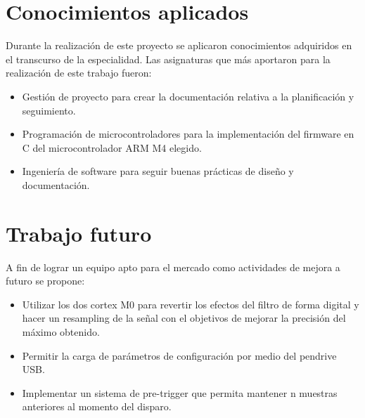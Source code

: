 \newpage
\section{Conocimientos aplicados}

Durante la realización de este proyecto se aplicaron conocimientos adquiridos en el transcurso de la especialidad. Las asignaturas que más aportaron para la realización de este trabajo fueron:
\begin{itemize}
\item Gestión de proyecto para crear la documentación relativa a la planificación y seguimiento.
\item Programación de microcontroladores para la implementación del firmware en C del microcontrolador ARM M4 elegido.
\item Ingeniería de software para seguir buenas prácticas de diseño y documentación.
\end{itemize}

\section{Trabajo futuro}
A fin de lograr un equipo apto para el mercado como actividades de mejora a futuro se propone:
\begin{itemize}
\item Utilizar los dos cortex M0 para revertir los efectos del filtro de forma digital y hacer un resampling de la señal con el objetivos de mejorar la precisión del máximo obtenido.
\item Permitir la carga de parámetros de configuración por medio del pendrive USB. 
\item Implementar un sistema de pre-trigger que permita mantener n muestras anteriores al momento del disparo.
\end{itemize}
